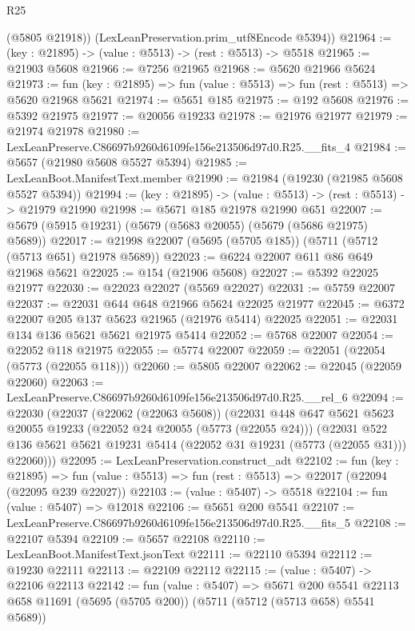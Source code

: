 \begin{lexlean}{R25}
\begin{coremodule}
        (@5805 @21918))
      (LexLeanPreservation.prim_utf8Encode @5394))
@21964 := (key : @21895) -> (value : @5513) -> (rest : @5513) -> @5518
@21965 := @21903 @5608
@21966 := @7256 @21965
@21968 := @5620 @21966 @5624
@21973 := fun (key : @21895) => fun (value : @5513) => fun (rest : @5513) => @5620 @21968 @5621
@21974 := @5651 @185
@21975 := @192 @5608
@21976 := @5392 @21975
@21977 := @20056 @19233
@21978 := @21976 @21977
@21979 := @21974 @21978
@21980 := LexLeanPreserve.C86697b9260d6109fe156e213506d97d0.R25.__fits_4
@21984 := @5657 (@21980 @5608 @5527 @5394)
@21985 := LexLeanBoot.ManifestText.member
@21990 := @21984 (@19230 (@21985 @5608 @5527 @5394))
@21994 := (key : @21895) -> (value : @5513) -> (rest : @5513) -> @21979 @21990
@21998 := @5671 @185 @21978 @21990 @651
@22007 := @5679 (@5915 @19231) (@5679 (@5683 @20055) (@5679 (@5686 @21975) @5689))
@22017 := @21998 @22007 (@5695 (@5705 @185)) (@5711 (@5712 (@5713 @651) @21978 @5689))
@22023 := @6224 @22007 @611 @86 @649 @21968 @5621
@22025 := @154 (@21906 @5608)
@22027 := @5392 @22025 @21977
@22030 := @22023 @22027 (@5569 @22027)
@22031 := @5759 @22007
@22037 := @22031 @644 @648 @21966 @5624 @22025 @21977
@22045 := @6372 @22007 @205 @137 @5623 @21965 (@21976 @5414) @22025
@22051 := @22031 @134 @136 @5621 @5621 @21975 @5414
@22052 := @5768 @22007
@22054 := @22052 @118 @21975
@22055 := @5774 @22007
@22059 := @22051 (@22054 (@5773 (@22055 @118)))
@22060 := @5805 @22007
@22062 := @22045 (@22059 @22060)
@22063 := LexLeanPreserve.C86697b9260d6109fe156e213506d97d0.R25.__rel_6
@22094 := @22030
    (@22037
      (@22062 (@22063 @5608))
      (@22031
        @448
        @647
        @5621
        @5623
        @20055
        @19233
        (@22052 @24 @20055 (@5773 (@22055 @24)))
        (@22031
          @522
          @136
          @5621
          @5621
          @19231
          @5414
          (@22052 @31 @19231 (@5773 (@22055 @31)))
          @22060)))
@22095 := LexLeanPreservation.construct_adt
@22102 := fun (key : @21895) =>
  fun (value : @5513) => fun (rest : @5513) => @22017 (@22094 (@22095 @239 @22027))
@22103 := (value : @5407) -> @5518
@22104 := fun (value : @5407) => @12018
@22106 := @5651 @200 @5541
@22107 := LexLeanPreserve.C86697b9260d6109fe156e213506d97d0.R25.__fits_5
@22108 := @22107 @5394
@22109 := @5657 @22108
@22110 := LexLeanBoot.ManifestText.jsonText
@22111 := @22110 @5394
@22112 := @19230 @22111
@22113 := @22109 @22112
@22115 := (value : @5407) -> @22106 @22113
@22142 := fun (value : @5407) =>
  @5671
    @200
    @5541
    @22113
    @658
    @11691
    (@5695 (@5705 @200))
    (@5711 (@5712 (@5713 @658) @5541 @5689))

\end{coremodule}
\end{lexlean}
